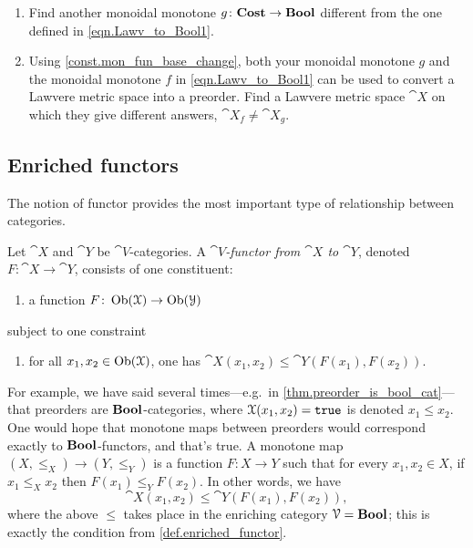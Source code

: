 \documentclass[7Sketches]{subfiles}
\begin{document}
\begin{exercise} %
\label{exc.metric_to_poset}
\begin{enumerate}
	\item Find another monoidal monotone $g\colon\mathbf{Cost}\to\mathbf{Bool}$ different from the one defined in \cref{eqn.Lawv_to_Bool1}.
	\item Using \cref{const.mon_fun_base_change}, both your monoidal
	monotone $g$ and the monoidal monotone $f$ in \cref{eqn.Lawv_to_Bool1}
	can be used to convert a Lawvere metric space into a preorder. Find a
	Lawvere metric space $\cat{X}$ on which they give different answers,
	$\cat{X}_f\neq\cat{X}_g$.
	\qedhere
\end{enumerate}
\end{exercise}



\subsection{Enriched functors} %
\label{subsec.enriched_functors}%
%
The notion of functor provides the most important type of relationship between categories.
\begin{definition}%
\label{def.enriched_functor}
Let $\cat{X}$ and $\cat{Y}$ be $\cat{V}$-categories. A \emph{$\cat{V}$-functor from $\cat{X}$ to $\cat{Y}$}, denoted $F\colon\cat{X}\to\cat{Y}$, consists of one constituent:
\begin{enumerate}[label=(\roman*)]
	\item a function $F\colon\operatorname{Ob}(\mathcal{X})\to\operatorname{Ob}(\mathcal{Y})$
\end{enumerate}
subject to one constraint
\begin{enumerate}[label=(\alph*)]
	\item for all $x_1,x_2\in\operatorname{Ob}(\mathcal{X})$, one has $\cat{X}(x_1,x_2)\leq\cat{Y}(F(x_1),F(x_2))$.
\end{enumerate}
\end{definition}

\begin{example}%
\label{ex.bool_functors_monotone}%
For example, we have said several times---e.g.\ in \cref{thm.preorder_is_bool_cat}---that preorders are $\mathbf{Bool}$-categories, where $\mathcal{X}(x_1,x_2)=\mathtt{true}$ is denoted $x_1\leq x_2$. One would hope that monotone maps between preorders would correspond exactly to $\mathbf{Bool}$-functors, and that's true. A monotone map $(X,\leq_X)\to(Y,\leq_Y)$ is a function $F\colon X\to Y$ such that for every $x_1,x_2\in X$, if $x_1\leq_X x_2$ then $F(x_1)\leq_Y F(x_2)$. In other words, we have
\[\cat{X}(x_1,x_2)\leq\cat{Y}(F(x_1),F(x_2)),\]
where the above $\leq$ takes place in the enriching category $\mathcal{V}=\mathbf{Bool}$; this is exactly the condition from \cref{def.enriched_functor}.
\end{example}
\end{document}
